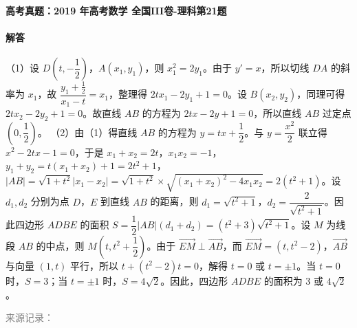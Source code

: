 \documentclass[UTF8,a4paper,11pt]{ctexart}
\newenvironment{gaokao}[1]{\par\medskip\noindent\textbf{高考真题：#1}\par\smallskip}{\par\medskip}
\begin{document}
\begin{gaokao}{2019 年高考数学 全国III卷-理科第21题}
\paragraph{解答}

（1）设 $D\left(t,-\dfrac{1}{2}\right)$，$A(x_1,y_1)$，则 $x_1^2=2y_1$。由于 $y'=x$，所以切线 $DA$ 的斜率为 $x_1$，故 $\dfrac{y_1+\frac{1}{2}}{x_1-t}=x_1$，整理得 $2tx_1-2y_1+1=0$。设 $B(x_2,y_2)$，同理可得 $2tx_2-2y_2+1=0$。故直线 $AB$ 的方程为 $2tx-2y+1=0$，所以直线 $AB$ 过定点 $\left(0,\dfrac{1}{2}\right)$。
（2）由（1）得直线 $AB$ 的方程为 $y=tx+\dfrac{1}{2}$。与 $y=\dfrac{x^2}{2}$ 联立得 $x^2-2tx-1=0$，于是 $x_1+x_2=2t$，$x_1x_2=-1$，$y_1+y_2=t(x_1+x_2)+1=2t^2+1$，$|AB|=\sqrt{1+t^2}|x_1-x_2|=\sqrt{1+t^2}\times\sqrt{(x_1+x_2)^2-4x_1x_2}=2(t^2+1)$。设 $d_1,d_2$ 分别为点 $D$，$E$ 到直线 $AB$ 的距离，则 $d_1=\sqrt{t^2+1}$，$d_2=\dfrac{2}{\sqrt{t^2+1}}$。因此四边形 $ADBE$ 的面积 $S=\dfrac{1}{2}|AB|(d_1+d_2)=(t^2+3)\sqrt{t^2+1}$。设 $M$ 为线段 $AB$ 的中点，则 $M\left(t,t^2+\dfrac{1}{2}\right)$。由于 $\overrightarrow{EM}\perp\overrightarrow{AB}$，而 $\overrightarrow{EM}=(t,t^2-2)$，$\overrightarrow{AB}$ 与向量 $(1,t)$ 平行，所以 $t+(t^2-2)t=0$，解得 $t=0$ 或 $t=\pm1$。当 $t=0$ 时，$S=3$；当 $t=\pm1$ 时，$S=4\sqrt{2}$。因此，四边形 $ADBE$ 的面积为 $3$ 或 $4\sqrt{2}$。

\par\smallskip\textcolor{gray}{\footnotesize 来源记录：\texttt{}}

\end{gaokao}
\end{document}
